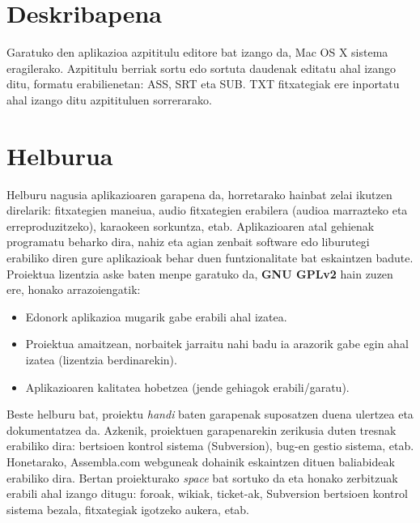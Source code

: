 
\section{Deskribapena}
Garatuko den aplikazioa azpititulu editore bat izango da, Mac OS X sistema eragilerako. Azpititulu berriak sortu edo sortuta daudenak editatu ahal izango ditu, formatu erabilienetan: ASS, SRT eta SUB. TXT fitxategiak ere inportatu ahal izango ditu azpitituluen sorrerarako.

\section{Helburua}
Helburu nagusia aplikazioaren garapena da, horretarako hainbat zelai ikutzen direlarik: fitxategien maneiua, audio fitxategien erabilera (audioa marrazteko eta erreproduzitzeko), karaokeen sorkuntza, etab.
Aplikazioaren atal gehienak programatu beharko dira, nahiz eta agian zenbait software edo liburutegi erabiliko diren gure aplikazioak behar duen funtzionalitate bat eskaintzen badute.
Proiektua lizentzia aske baten menpe garatuko da, \textbf{GNU GPLv2} hain zuzen ere, honako arrazoiengatik:
\begin{itemize}
\item Edonork aplikazioa mugarik gabe erabili ahal izatea.
\item Proiektua amaitzean, norbaitek jarraitu nahi badu ia arazorik gabe egin ahal izatea (lizentzia berdinarekin).
\item Aplikazioaren kalitatea hobetzea (jende gehiagok erabili/garatu).
\end{itemize}
Beste helburu bat, proiektu \textit{handi} baten garapenak suposatzen duena ulertzea eta dokumentatzea da.
Azkenik, proiektuen garapenarekin zerikusia duten tresnak erabiliko dira: bertsioen kontrol sistema (Subversion), bug-en gestio sistema, etab. Honetarako, Assembla.com webguneak dohainik eskaintzen dituen baliabideak erabiliko dira. Bertan proiekturako \textit{space} bat sortuko da eta honako zerbitzuak erabili ahal izango ditugu: foroak, wikiak, ticket-ak, Subversion bertsioen kontrol sistema bezala, fitxategiak igotzeko aukera, etab.

